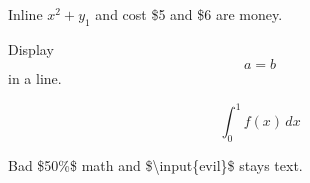 Inline $x^2 + y_1$ and cost \$5 and \$6 are money.

Display \[a = b\] in a line.

\[
\int_0^1 f(x)\,dx
\]

Bad \$50\%\$ math and \$\textbackslash{}input\{evil\}\$ stays text.
